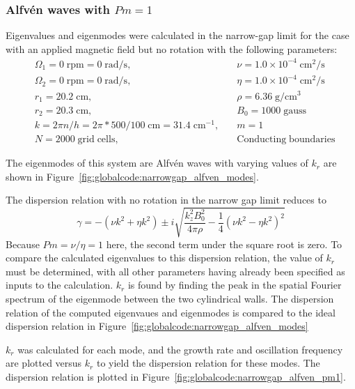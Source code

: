 \documentclass[letterpaper]{article}
\begin{document}
\subsubsection{Alfv\'en waves with $Pm=1$}

Eigenvalues and eigenmodes were calculated in the narrow-gap limit for
the case with an applied magnetic field but no rotation with the
following parameters:
\begin{align*}
&\Omega_1 = 0\;\mathrm{rpm} = 0\;\mathrm{rad/s},\quad
    &\nu = 1.0\times10^{-4}\;\mathrm{cm^2/s}
\\
&\Omega_2 = 0\;\mathrm{rpm} = 0\;\mathrm{rad/s},\quad
    &\eta = 1.0\times10^{-4}\;\mathrm{cm^2/s}
\\
&r_1 = 20.2\;\mathrm{cm},\quad &\rho = 6.36\;\mathrm{g/cm^3}
\\
&r_2 = 20.3\;\mathrm{cm},\quad &B_0 = 1000\; \mathrm{gauss}
\\
&k = 2\pi n/h = 2\pi*500/100\;\mathrm{cm} = 31.4\;\mathrm{cm^{-1}},\quad
    &m=1
\\
&N = 2000\;\mathrm{grid\;cells},\quad &\mathrm{Conducting\;boundaries}
\end{align*}

The eigenmodes of this system are Alfv\'en waves with varying values
of $k_r$ are shown in
Figure~\ref{fig:globalcode:narrowgap_alfven_modes}.

The dispersion relation with no rotation in the narrow gap limit reduces to
\begin{equation}
\gamma = -(\nu k^2 + \eta k^2) 
         \pm i\sqrt{\frac{k_z^2B_0^2}{4\pi\rho} 
                    - \frac{1}{4}\left(\nu k^2 - \eta k^2\right)^2}
\label{eqn:globalcode:alfven_wave_dr}
\end{equation}
Because $Pm=\nu/\eta=1$ here, the second term under the square root is
zero. To compare the calculated eigenvalues to this dispersion
relation, the value of $k_r$ must be determined, with all other
parameters having already been specified as inputs to the
calculation. $k_r$ is found by finding the peak in the spatial Fourier
spectrum of the eigenmode between the two cylindrical walls. The dispersion relation of the computed eigenvaues and eigenmodes is compared to the ideal dispersion relation in Figure~\ref{fig:globalcode:narrowgap_alfven_modes}

$k_r$ was calculated for each mode, and the growth rate and
oscillation frequency are plotted versus $k_r$ to yield the dispersion
relation for these modes.  The dispersion relation is plotted in
Figure~\ref{fig:globalcode:narrowgap_alfven_pm1}.
\end{document}
